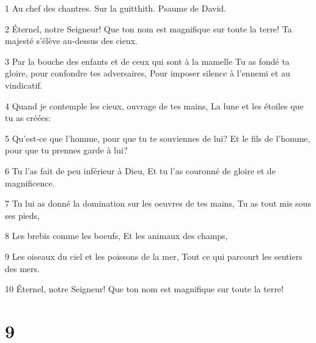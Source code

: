 \par 1 Au chef des chantres. Sur la guitthith. Psaume de David.
\par 2 Éternel, notre Seigneur! Que ton nom est magnifique sur toute la terre! Ta majesté s'élève au-dessus des cieux.
\par 3 Par la bouche des enfants et de ceux qui sont à la mamelle Tu as fondé ta gloire, pour confondre tes adversaires, Pour imposer silence à l'ennemi et au vindicatif.
\par 4 Quand je contemple les cieux, ouvrage de tes mains, La lune et les étoiles que tu as créées:
\par 5 Qu'est-ce que l'homme, pour que tu te souviennes de lui? Et le fils de l'homme, pour que tu prennes garde à lui?
\par 6 Tu l'as fait de peu inférieur à Dieu, Et tu l'as couronné de gloire et de magnificence.
\par 7 Tu lui as donné la domination sur les oeuvres de tes mains, Tu as tout mis sous ses pieds,
\par 8 Les brebis comme les boeufs, Et les animaux des champs,
\par 9 Les oiseaux du ciel et les poissons de la mer, Tout ce qui parcourt les sentiers des mers.
\par 10 Éternel, notre Seigneur! Que ton nom est magnifique sur toute la terre!

\chapter{9}

